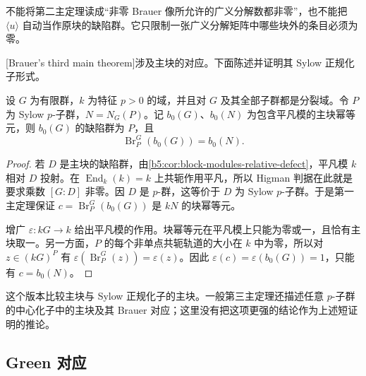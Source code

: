 不能将第二主定理读成“非零 Brauer 像所允许的广义分解数都非零”，也不能把 \(\langle u\rangle\) 自动当作原块的缺陷群。它只限制一张广义分解矩阵中哪些块外的条目必须为零。

[Brauer's third main theorem]涉及主块的对应。下面陈述并证明其 Sylow 正规化子形式。
\begin{theorem}\label{b5:thm:brauer-third-main-sylow}
	设 \(G\) 为有限群，\(k\) 为特征 \(p>0\) 的域，并且对 \(G\) 及其全部子群都是分裂域。令 \(P\) 为 Sylow \(p\)-子群，\(N=N_G(P)\)。记 \(b_0(G)\)、\(b_0(N)\) 为包含平凡模的主块幂等元，则 \(b_0(G)\) 的缺陷群为 \(P\)，且
	\[
		\operatorname{Br}_P^G(b_0(G))=b_0(N).
	\]
\end{theorem}
\begin{proof}
	若 \(D\) 是主块的缺陷群，由\cref{b5:cor:block-modules-relative-defect}，平凡模 \(k\) 相对 \(D\) 投射。在 \(\operatorname{End}_k(k)=k\) 上共轭作用平凡，所以 Higman 判据在此就是要求乘数 \([G:D]\) 非零。因 \(D\) 是 \(p\)-群，这等价于 \(D\) 为 Sylow \(p\)-子群。于是第一主定理保证 \(c=\operatorname{Br}_P^G(b_0(G))\) 是 \(kN\) 的块幂等元。

	增广 \(\varepsilon:kG\to k\) 给出平凡模的作用。块幂等元在平凡模上只能为零或一，且恰有主块取一。另一方面，\(P\) 的每个非单点共轭轨道的大小在 \(k\) 中为零，所以对 \(z\in(kG)^P\) 有 \(\varepsilon(\operatorname{Br}_P^G(z))=\varepsilon(z)\)。因此 \(\varepsilon(c)=\varepsilon(b_0(G))=1\)，只能有 \(c=b_0(N)\)。
\end{proof}
这个版本比较主块与 Sylow 正规化子的主块。一般第三主定理还描述任意 \(p\)-子群的中心化子中的主块及其 Brauer 对应；这里没有把这项更强的结论作为上述短证明的推论。

\subsection{Green 对应}
\label{b5:subsec:0806:03}

